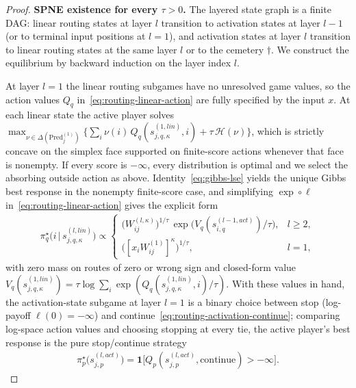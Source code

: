 \documentclass[twoside]{article}
\newcommand{\1}{\mathbf{1}}
\begin{document}
\begin{proof}
\textbf{SPNE existence for every $\tau > 0$.} The layered state graph is a finite DAG: linear
routing states at layer $l$ transition to activation states at layer $l-1$ (or to terminal input
positions at $l=1$), and activation states at layer $l$ transition to linear routing states at the
same layer $l$ or to the cemetery $\dagger$. We construct the equilibrium by backward induction on
the layer index $l$.

At layer $l=1$ the linear routing subgames have no unresolved game values, so the action values
$Q_q$ in~\eqref{eq:routing-linear-action} are fully specified by the input $x$. At each linear
state the active player solves $\max_{\nu \in \Delta(\mathrm{Pred}_j^{(1)})} \{ \sum_i \nu(i)\,
    Q_q(s_{j,q,\kappa}^{(1, lin)}, i) + \tau\, \mathcal{H}(\nu) \}$, which is strictly concave on the simplex face supported on finite-score actions whenever that face is nonempty. If every score is $-\infty$, every distribution is optimal and we select the absorbing outside action as above. Identity~\eqref{eq:gibbs-lse} yields the unique Gibbs best response in the nonempty finite-score case, and simplifying $\exp
    \circ \ell$ in~\eqref{eq:routing-linear-action} gives the explicit form
\begin{align}\label{eq:routing-spne-linear}
    \pi_q^\star\!\bigl(i \,\big|\, s_{j,q,\kappa}^{(l, lin)}\bigr)
    \propto
    \begin{cases}
        \bigl(W_{ij}^{(l,\kappa)}\bigr)^{1/\tau}\, \exp\!\bigl( V_q(s_{i,q}^{(l-1, act)})/\tau \bigr), & l
        \ge 2, \\[0.25em]
        \bigl([x_i W_{ij}^{(1)}]^\kappa\bigr)^{1/\tau}, & l = 1,
    \end{cases}
\end{align}
with zero mass on routes of zero or wrong sign and closed-form value $V_q(s_{j,q,\kappa}^{(1,lin)})
    = \tau \log \sum_i \exp(Q_q(s_{j,q,\kappa}^{(1,lin)},i)/\tau)$. With these values in hand, the
activation-state subgame at layer $l=1$ is a binary choice between stop (log-payoff $\ell(0) =
    -\infty$) and continue~\eqref{eq:routing-activation-continue}; comparing log-space action values and choosing stopping at every tie, the active player's best response is the pure stop/continue strategy
\begin{align}\label{eq:routing-spne-stop}
    \pi_p^\star\bigl(s_{j,p}^{(l, act)}\bigr)
    = \1\!\bigl[ Q_p(s_{j,p}^{(l, act)}, \mathrm{continue}) > -\infty \bigr].
\end{align}


\end{proof}
\end{document}
